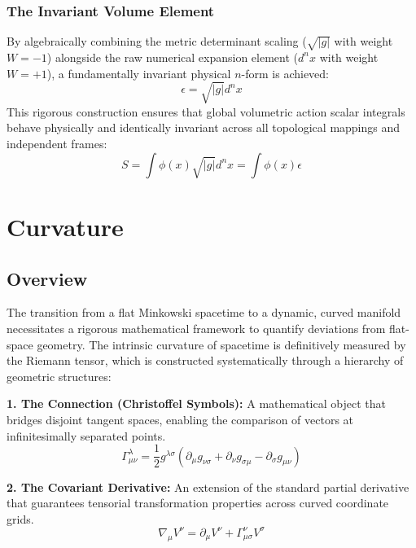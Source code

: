 \documentclass[11pt, a4paper]{report}
\begin{document}
\subsection*{The Invariant Volume Element}
By algebraically combining the metric determinant scaling ($\sqrt{|g|}$ with weight $W=-1$) alongside the raw numerical expansion element ($d^n x$ with weight $W=+1$), a fundamentally invariant physical $n$-form is achieved:
\begin{equation} \epsilon = \sqrt{|g|} d^n x \end{equation}
This rigorous construction ensures that global volumetric action scalar integrals behave physically and identically invariant across all topological mappings and independent frames:
\begin{equation} S = \int \phi(x) \sqrt{|g|} d^n x = \int \phi(x) \epsilon \end{equation}

\chapter{Curvature}

\section{Overview}
The transition from a flat Minkowski spacetime to a dynamic, curved manifold necessitates a rigorous mathematical framework to quantify deviations from flat-space geometry. The intrinsic curvature of spacetime is definitively measured by the Riemann tensor, which is constructed systematically through a hierarchy of geometric structures:

\textbf{1. The Connection (Christoffel Symbols):} A mathematical object that bridges disjoint tangent spaces, enabling the comparison of vectors at infinitesimally separated points.
\begin{equation}\label{eq:christoffel_preview}
\Gamma_{\mu\nu}^{\lambda} = \frac{1}{2}g^{\lambda\sigma} (\partial_{\mu}g_{\nu\sigma} + \partial_{\nu}g_{\sigma\mu} - \partial_{\sigma}g_{\mu\nu})
\end{equation}

\textbf{2. The Covariant Derivative:} An extension of the standard partial derivative that guarantees tensorial transformation properties across curved coordinate grids.
\begin{equation}\label{eq:cov_deriv_preview}
\nabla_{\mu}V^{\nu} = \partial_{\mu}V^{\nu} + \Gamma_{\mu\sigma}^{\nu}V^{\sigma}
\end{equation}
\end{document}
